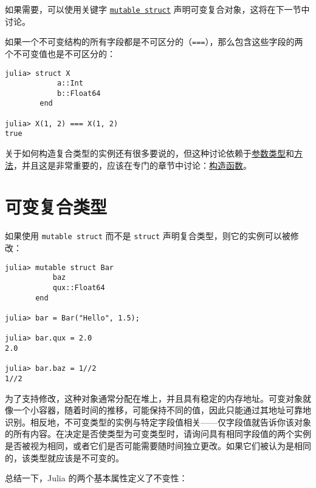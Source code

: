 如果需要，可以使用关键字 \hyperlink{15383430693516362700}{\texttt{mutable struct}} 声明可变复合对象，这将在下一节中讨论。



如果一个不可变结构的所有字段都是不可区分的（\texttt{===}），那么包含这些字段的两个不可变值也是不可区分的：




\begin{verbatim}
julia> struct X
            a::Int
            b::Float64
        end

julia> X(1, 2) === X(1, 2)
true
\end{verbatim}



关于如何构造复合类型的实例还有很多要说的，但这种讨论依赖于\href{@ref}{参数类型}和\hyperlink{3842379394166369470}{方法}，并且这是非常重要的，应该在专门的章节中讨论：\hyperlink{1489967485005487723}{构造函数}。



\hypertarget{17783679803569553227}{}


\section{可变复合类型}



如果使用 \texttt{mutable struct} 而不是 \texttt{struct} 声明复合类型，则它的实例可以被修改：




\begin{verbatim}
julia> mutable struct Bar
           baz
           qux::Float64
       end

julia> bar = Bar("Hello", 1.5);

julia> bar.qux = 2.0
2.0

julia> bar.baz = 1//2
1//2
\end{verbatim}



为了支持修改，这种对象通常分配在堆上，并且具有稳定的内存地址。可变对象就像一个小容器，随着时间的推移，可能保持不同的值，因此只能通过其地址可靠地识别。相反地，不可变类型的实例与特定字段值相关——仅字段值就告诉你该对象的所有内容。在决定是否使类型为可变类型时，请询问具有相同字段值的两个实例是否被视为相同，或者它们是否可能需要随时间独立更改。如果它们被认为是相同的，该类型就应该是不可变的。



总结一下，Julia 的两个基本属性定义了不变性：



